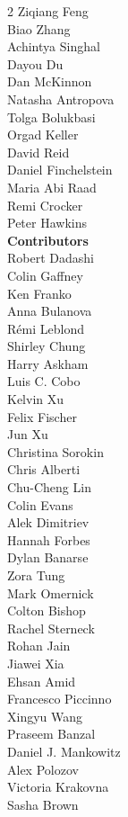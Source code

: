 \begin{multicols}{2}
Ziqiang Feng \\
Biao Zhang \\
Achintya Singhal \\
Dayou Du \\
Dan McKinnon \\
Natasha Antropova \\
Tolga Bolukbasi \\
Orgad Keller \\
David Reid \\
Daniel Finchelstein \\
Maria Abi Raad \\
Remi Crocker \\
Peter Hawkins \\
\textbf{Contributors} \\
Robert Dadashi \\
Colin Gaffney \\
Ken Franko \\
Anna Bulanova \\
Rémi Leblond \\
Shirley Chung \\
Harry Askham \\
Luis C. Cobo \\
Kelvin Xu \\
Felix Fischer \\
Jun Xu \\
Christina Sorokin \\
Chris Alberti \\
Chu-Cheng Lin \\
Colin Evans \\
Alek Dimitriev \\
Hannah Forbes \\
Dylan Banarse \\
Zora Tung \\
Mark Omernick \\
Colton Bishop \\
Rachel Sterneck \\
Rohan Jain \\
Jiawei Xia \\
Ehsan Amid \\
Francesco Piccinno \\
Xingyu Wang \\
Praseem Banzal \\
Daniel J. Mankowitz \\
Alex Polozov \\
Victoria Krakovna \\
Sasha Brown \\

\end{multicols}

